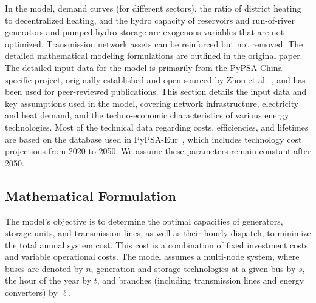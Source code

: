 \documentclass[preprint,12pt]{elsarticle}
\begin{document}
In the model, demand curves (for different sectors), the ratio of district heating to decentralized heating, and the hydro capacity of reservoirs and run-of-river generators and pumped hydro storage are exogenous variables that are not optimized. Transmission network assets can be reinforced but not removed. The detailed mathematical modeling formulations are outlined in the original paper. The detailed input data for the model is primarily from the PyPSA China-specific project, originally established and open sourced by Zhou et al.~\citep{zhou_multienergy_2024}, and has been used for peer-reviewed publications.
This section details the input data and key assumptions used in the model, covering network infrastructure, electricity and heat demand, and the techno-economic characteristics of various energy technologies. Most of the technical data regarding costs, efficiencies, and lifetimes are based on the database used in PyPSA-Eur~\citep{PyPSAEur}, which includes technology cost projections from 2020 to 2050. We assume these parameters remain constant after 2050.

\subsection{Mathematical Formulation}
The model's objective is to determine the optimal capacities of generators, storage units, and transmission lines, as well as their hourly dispatch, to minimize the total annual system cost. This cost is a combination of fixed investment costs and variable operational costs. The model assumes a multi-node system, where buses are denoted by $n$, generation and storage technologies at a given bus by $s$, the hour of the year by $t$, and branches (including transmission lines and energy converters) by $\ell$.
\end{document}
